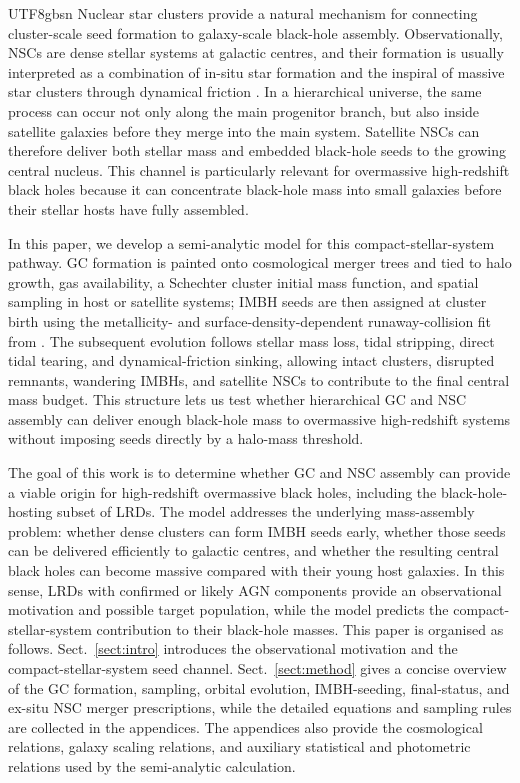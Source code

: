 \documentclass[trackchanges, twocolappendix, twocolumn]{aastex701}
\begin{document}
\begin{CJK*}{UTF8}{gbsn}
Nuclear star clusters provide a natural mechanism for connecting cluster-scale seed formation to galaxy-scale black-hole assembly. Observationally, NSCs are dense stellar systems at galactic centres, and their formation is usually interpreted as a combination of in-situ star formation and the inspiral of massive star clusters through dynamical friction \citep{Neumayer+2020}. In a hierarchical universe, the same process can occur not only along the main progenitor branch, but also inside satellite galaxies before they merge into the main system. Satellite NSCs can therefore deliver both stellar mass and embedded black-hole seeds to the growing central nucleus. This channel is particularly relevant for overmassive high-redshift black holes because it can concentrate black-hole mass into small galaxies before their stellar hosts have fully assembled.

In this paper, we develop a semi-analytic model for this compact-stellar-system pathway. GC formation is painted onto cosmological merger trees and tied to halo growth, gas availability, a Schechter cluster initial mass function, and spatial sampling in host or satellite systems; IMBH seeds are then assigned at cluster birth using the metallicity- and surface-density-dependent runaway-collision fit from \cite{Rantala+2026FROST}. The subsequent evolution follows stellar mass loss, tidal stripping, direct tidal tearing, and dynamical-friction sinking, allowing intact clusters, disrupted remnants, wandering IMBHs, and satellite NSCs to contribute to the final central mass budget. This structure lets us test whether hierarchical GC and NSC assembly can deliver enough black-hole mass to overmassive high-redshift systems without imposing seeds directly by a halo-mass threshold.

The goal of this work is to determine whether GC and NSC assembly can provide a viable origin for high-redshift overmassive black holes, including the black-hole-hosting subset of LRDs. The model addresses the underlying mass-assembly problem: whether dense clusters can form IMBH seeds early, whether those seeds can be delivered efficiently to galactic centres, and whether the resulting central black holes can become massive compared with their young host galaxies. In this sense, LRDs with confirmed or likely AGN components provide an observational motivation and possible target population, while the model predicts the compact-stellar-system contribution to their black-hole masses. This paper is organised as follows. Sect.~\ref{sect:intro} introduces the observational motivation and the compact-stellar-system seed channel. Sect.~\ref{sect:method} gives a concise overview of the GC formation, sampling, orbital evolution, IMBH-seeding, final-status, and ex-situ NSC merger prescriptions, while the detailed equations and sampling rules are collected in the appendices. The appendices also provide the cosmological relations, galaxy scaling relations, and auxiliary statistical and photometric relations used by the semi-analytic calculation.


\end{CJK*}
\end{document}
